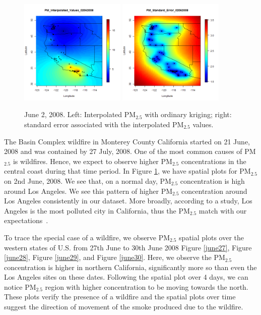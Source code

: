 \documentclass[10pt]{article}
\begin{document}
\begin{figure}[H]
\centering
  \includegraphics[width=0.45\textwidth]{Interpolated_PM2008_0154.png}
  \includegraphics[width=0.45\textwidth]{Standard_Error_PM2008_0154.png}
\caption{June 2, 2008.  Left: Interpolated PM$_{2.5}$ with ordinary kriging; right:
standard error associated with the interpolated PM$_{2.5}$ values.}
\label{normalday}
\end{figure}

The Basin Complex wildfire in Monterey County California started on 21 June,
2008 and was contained by 27 July, 2008. One of the most common causes of
PM$_{2.5}$ is wildfires. Hence, we expect to observe higher PM$_{2.5}$
concentrations in the central coast during that time period. In Figure
\ref{normalday}, we have spatial plots for PM$_{2.5}$ on 2nd June, 2008. We see
that, on a normal day, PM$_{2.5}$ concentration is high around Los Angeles. We
see this pattern of higher PM$_{2.5}$ concentration around Los Angeles
consistently in our dataset.  More broadly, according to a study, Los Angeles
is the most polluted city in California, thus the PM$_{2.5}$ match with our
expectations~\cite{fire3}.



To trace the special case of a wildfire, we observe PM$_{2.5}$ spatial plots
over the western states of U.S. from 27th June to 30th June 2008 Figure
\ref{june27}, Figure \ref{june28}, Figure \ref{june29}, and Figure \ref{june30}.
Here, we observe the PM$_{2.5}$ concentration is higher in northern California,
significantly more so than even the Los Angeles sites on these dates. Following
the spatial plot over 4 days, we can notice PM$_{2.5}$ region with higher
concentration to be moving towards the north. These plots verify the presence
of a wildfire and the spatial plots over time suggest the direction of movement
of the smoke produced due to the wildfire. 
\end{document}
